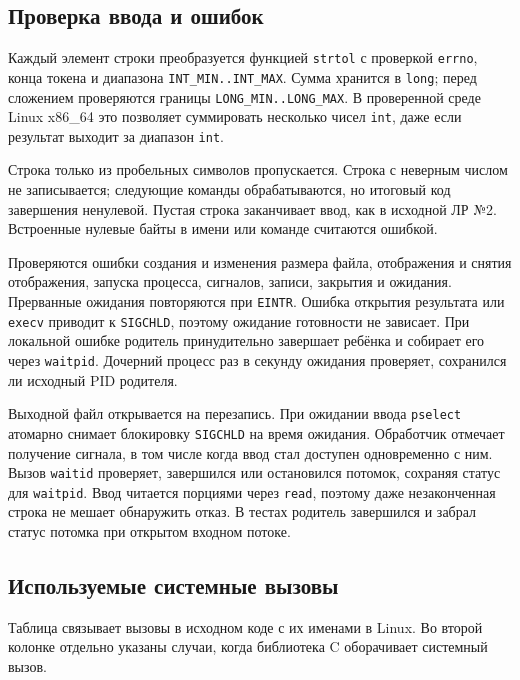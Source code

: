 \documentclass[12pt,a4paper]{article}
\begin{document}
\subsection{Проверка ввода и ошибок}
Каждый элемент строки преобразуется функцией \texttt{strtol} с проверкой \texttt{errno}, конца токена и диапазона \texttt{INT\_MIN..INT\_MAX}. Сумма хранится в \texttt{long}; перед сложением проверяются границы \texttt{LONG\_MIN..LONG\_MAX}. В проверенной среде Linux x86\_64 это позволяет суммировать несколько чисел \texttt{int}, даже если результат выходит за диапазон \texttt{int}.

Строка только из пробельных символов пропускается. Строка с неверным числом не записывается; следующие команды обрабатываются, но итоговый код завершения ненулевой. Пустая строка заканчивает ввод, как в исходной ЛР №2. Встроенные нулевые байты в имени или команде считаются ошибкой.

Проверяются ошибки создания и изменения размера файла, отображения и снятия отображения, запуска процесса, сигналов, записи, закрытия и ожидания. Прерванные ожидания повторяются при \texttt{EINTR}. Ошибка открытия результата или \texttt{execv} приводит к \texttt{SIGCHLD}, поэтому ожидание готовности не зависает. При локальной ошибке родитель принудительно завершает ребёнка и собирает его через \texttt{waitpid}. Дочерний процесс раз в секунду ожидания проверяет, сохранился ли исходный PID родителя.

Выходной файл открывается на перезапись. При ожидании ввода \texttt{pselect} атомарно снимает блокировку \texttt{SIGCHLD} на время ожидания. Обработчик отмечает получение сигнала, в том числе когда ввод стал доступен одновременно с ним. Вызов \texttt{waitid} проверяет, завершился или остановился потомок, сохраняя статус для \texttt{waitpid}. Ввод читается порциями через \texttt{read}, поэтому даже незаконченная строка не мешает обнаружить отказ. В тестах родитель завершился и забрал статус потомка при открытом входном потоке.

\subsection{Используемые системные вызовы}

Таблица связывает вызовы в исходном коде с их именами в Linux. Во второй колонке отдельно указаны случаи, когда библиотека C оборачивает системный вызов.
\end{document}
